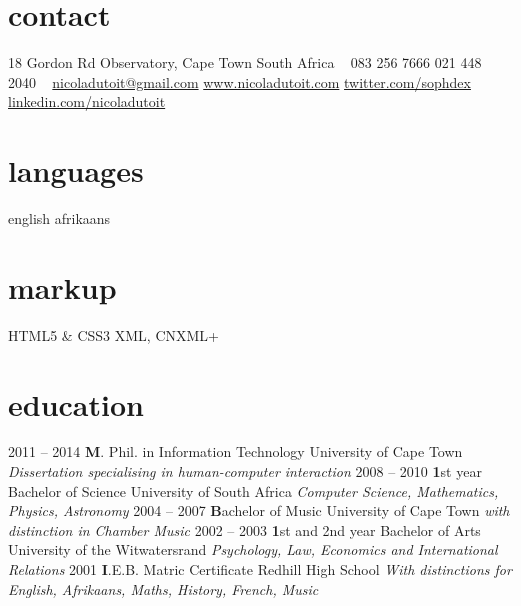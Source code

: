 \documentclass[]{friggeri-cv} %
\begin{document}


\begin{aside} %
\section{contact}
18 Gordon Rd
Observatory, Cape Town
South Africa
~
083 256 7666
021 448 2040
~
\href{mailto:nicoladutoit@gmail.com}{nicoladutoit@gmail.com}
\href{http://www.nicoladutoit.com}{www.nicoladutoit.com}
\href{https://twitter.com/sophdex}{twitter.com/sophdex}
\href{http://linkedin.com/nicoladutoit}{linkedin.com/nicoladutoit}
\section{languages}
english 
afrikaans
\section{markup}
HTML5 \& CSS3
XML, CNXML+
\end{aside}


\section{education}

\begin{entrylist}
\entry
{2011 -- 2014}
{\textbf M. Phil. in Information Technology}
{University of Cape Town}
{\emph{Dissertation specialising in human-computer interaction}}
\entry
{2008 -- 2010}
{\textbf 1st year Bachelor of Science}
{University of South Africa}
{\emph{Computer Science, Mathematics, Physics, Astronomy}}
\entry
{2004 -- 2007}
{\textbf Bachelor of Music}
{University of Cape Town}
{\emph{with distinction in Chamber Music}}
\entry
{2002 -- 2003}
{\textbf 1st and 2nd year Bachelor of Arts}
{University of the Witwatersrand}
{\emph{Psychology, Law, Economics and International Relations}}
\entry
{2001}
{\textbf I.E.B. Matric Certificate }
{Redhill High School}
{\emph{With distinctions for English, Afrikaans, Maths, History, French, Music}}

\end{entrylist}
\end{document}
